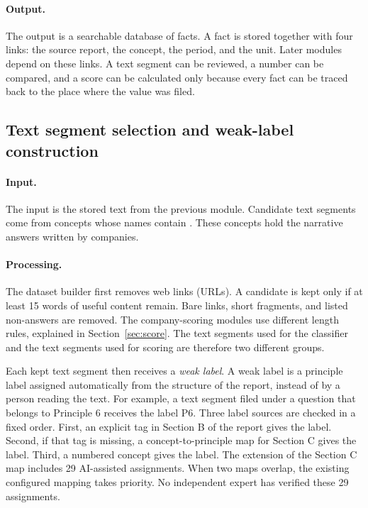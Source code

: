 \paragraph{Output.} The output is a searchable database of facts. A fact is stored together with four links: the source report, the concept, the period, and the unit. Later modules depend on these links. A text segment can be reviewed, a number can be compared, and a score can be calculated only because every fact can be traced back to the place where the value was filed.

\subsection{Text segment selection and weak-label construction}
\label{sec:labels}

\paragraph{Input.} The input is the stored text from the previous module. Candidate text segments come from concepts whose names contain . These concepts hold the narrative answers written by companies.

\paragraph{Processing.} The dataset builder first removes web links (URLs). A candidate is kept only if at least 15 words of useful content remain. Bare links, short fragments, and listed non-answers are removed. The company-scoring modules use different length rules, explained in Section~\ref{sec:score}. The text segments used for the classifier and the text segments used for scoring are therefore two different groups.

Each kept text segment then receives a \emph{weak label}. A weak label is a principle label assigned automatically from the structure of the report, instead of by a person reading the text. For example, a text segment filed under a question that belongs to Principle 6 receives the label P6. Three label sources are checked in a fixed order. First, an explicit  tag in Section B of the report gives the label. Second, if that tag is missing, a concept-to-principle map for Section C gives the label. Third, a numbered  concept gives the label. The extension of the Section C map includes 29 AI-assisted assignments. When two maps overlap, the existing configured mapping takes priority. No independent expert has verified these 29 assignments.


